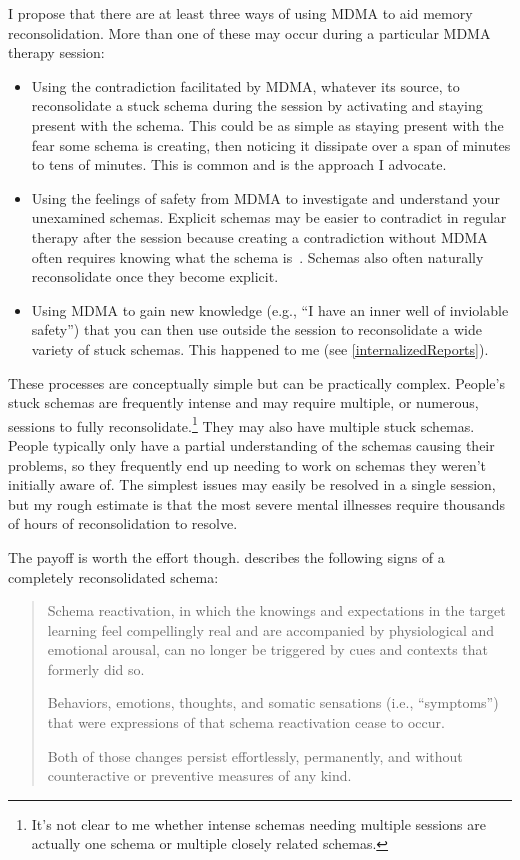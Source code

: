 \documentclass[11pt,oneside]{book}
\let\cite\parencite
\begin{document}
I propose that there are at least three ways of using MDMA to aid memory reconsolidation. More than one of these may occur during a particular MDMA therapy session:
\begin{itemize}
	\item Using the contradiction facilitated by MDMA, whatever its source, to reconsolidate a stuck schema during the session by activating and staying present with the schema. This could be as simple as staying present with the fear some schema is creating, then noticing it dissipate over a span of minutes to tens of minutes. This is common and is the approach I advocate.
	\item Using the feelings of safety from MDMA to investigate and understand your unexamined schemas. Explicit schemas may be easier to contradict in regular therapy after the session because creating a contradiction without MDMA often requires knowing what the schema is~\cite{eckerUnlocking}. Schemas also often naturally reconsolidate once they become explicit.
	\item Using MDMA to gain new knowledge (e.g., \enquote{I have an inner well of inviolable safety}) that you can then use outside the session to reconsolidate a wide variety of stuck schemas. This happened to me (see \cref{internalizedReports}).
\end{itemize}

These processes are conceptually simple but can be practically complex. People's stuck schemas are frequently intense and may require multiple, or numerous, sessions to fully reconsolidate.\footnote{It's not clear to me whether intense schemas needing multiple sessions are actually one schema or multiple closely related schemas.} They may also have multiple stuck schemas. People typically only have a partial understanding of the schemas causing their problems, so they frequently end up needing to work on schemas they weren't initially aware of. The simplest issues may easily be resolved in a single session, but my rough estimate is that the most severe mental illnesses require thousands of hours of reconsolidation to resolve.

The payoff is worth the effort though. \textcite[p. 22]{eckerUnlocking} describes the following signs of a completely reconsolidated schema:
\begin{quotation}
    Schema reactivation, in which the knowings and expectations in the target learning feel compellingly real and are accompanied by physiological and emotional arousal, can no longer be triggered by cues and contexts that formerly did so.

    Behaviors, emotions, thoughts, and somatic sensations (i.e., \enquote{symptoms}) that were expressions of that schema reactivation cease to occur.

    Both of those changes persist effortlessly, permanently, and without counteractive or preventive measures of any kind.
\end{quotation}
\end{document}
